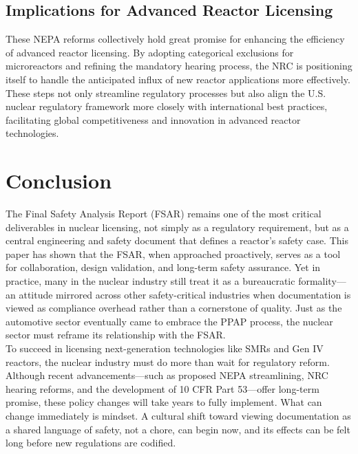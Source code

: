 \documentclass[5p,authoryear]{elsarticle}
\begin{document}
\subsection{Implications for Advanced Reactor Licensing}

These NEPA reforms collectively hold great promise for enhancing the efficiency of advanced reactor licensing. By adopting categorical exclusions for microreactors and refining the mandatory hearing process, the NRC is positioning itself to handle the anticipated influx of new reactor applications more effectively. These steps not only streamline regulatory processes but also align the U.S. nuclear regulatory framework more closely with international best practices, facilitating global competitiveness and innovation in advanced reactor technologies.

\section{Conclusion}

The Final Safety Analysis Report (FSAR) remains one of the most critical deliverables in nuclear licensing, not simply as a regulatory requirement, but as a central engineering and safety document that defines a reactor's safety case. This paper has shown that the FSAR, when approached proactively, serves as a tool for collaboration, design validation, and long-term safety assurance. Yet in practice, many in the nuclear industry still treat it as a bureaucratic formality—an attitude mirrored across other safety-critical industries when documentation is viewed as compliance overhead rather than a cornerstone of quality. Just as the automotive sector eventually came to embrace the PPAP process, the nuclear sector must reframe its relationship with the FSAR.\\

To succeed in licensing next-generation technologies like SMRs and Gen IV reactors, the nuclear industry must do more than wait for regulatory reform. Although recent advancements—such as proposed NEPA streamlining, NRC hearing reforms, and the development of 10 CFR Part 53—offer long-term promise, these policy changes will take years to fully implement. What can change immediately is mindset. A cultural shift toward viewing documentation as a shared language of safety, not a chore, can begin now, and its effects can be felt long before new regulations are codified.\\
\end{document}
